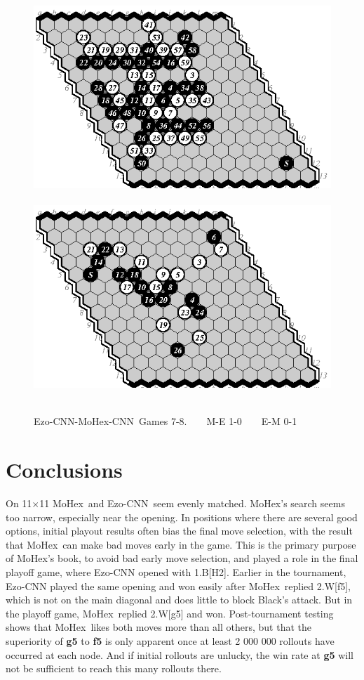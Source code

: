 \documentclass{icga}
\def\Ec{\mbox{\sc Ezo-CNN}}
\def\Mx{\mbox{\sc MoHex}}
\def\Mc{\mbox{\sc MoHex-CNN}}
\begin{document}
\begin{figure}[hbp]
\hfill\includegraphics[scale=1]{pix/13.me7.eps}\hfill\
\hfill\includegraphics[scale=1]{pix/13.em8.eps}\hfill~
\caption{\Ec{}-\Mc\ Games 7-8. ~ ~ M-E 1-0 ~ ~ E-M 0-1}
\end{figure}
\fi

\section{Conclusions}
On 11$\times$11 \Mx\ and \Ec\ seem evenly matched.
\Mx{}'s search seems too narrow, especially near the opening.
In positions where there are several good options,
initial playout results often bias the final move selection,
with the result that \Mx\ can make bad moves early in the game.
This is the primary purpose of \Mx's book, to 
avoid bad early move selection,
and played a role in the final playoff game, where \Ec{} opened 
with 1.B[H2].  Earlier in the tournament, \Ec{} played the same opening
and won easily after \Mx\ replied 2.W[f5], which is not on the main diagonal
and does little to block Black's attack.
But in the playoff game, \Mx\ replied 2.W[g5] and won.
Post-tournament testing shows that \Mx\ likes both moves more than all others,
but that the superiority of {\bf g5} to {\bf f5} is only apparent
once at least 2 000 000 rollouts have occurred at each node.
And if initial rollouts are unlucky, the win rate at {\bf g5} will not
be sufficient to reach this many rollouts there.
\end{document}
